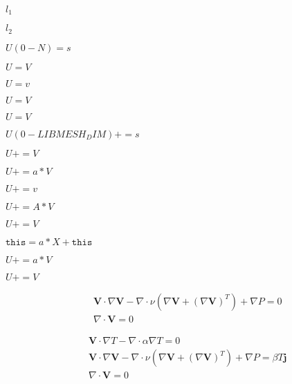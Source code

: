 \documentclass{article}
\begin{document}
$l_1$
\pagebreak

$l_2$
\pagebreak

$U(0-N) = s$
\pagebreak

$U = V$
\pagebreak

$ U=v $
\pagebreak

$U=V$
\pagebreak

$ U=V $
\pagebreak

$U(0-LIBMESH_DIM)+=s$
\pagebreak

$U+=V$
\pagebreak

$U+=a*V$
\pagebreak

$ U+=v $
\pagebreak

$U+=A*V$
\pagebreak

$ U+=V $
\pagebreak

$\texttt{this} = a*X + \texttt{this} $
\pagebreak

$ U+=a*V $
\pagebreak

$U+=V $
\pagebreak

\begin{eqnarray*} && \mathbf{V} \cdot \nabla \mathbf{V} - \nabla \cdot \nu (\nabla \mathbf{V} +(\nabla \mathbf{V})^T) +\nabla P = 0 \\ && \nabla \cdot \mathbf{V} = 0 \end{eqnarray*}
\pagebreak

\begin{eqnarray*} && \mathbf{V} \cdot \nabla T - \nabla \cdot\alpha \nabla T = 0 \\ && \mathbf{V} \cdot \nabla \mathbf{V} - \nabla \cdot \nu (\nabla \mathbf{V} +(\nabla \mathbf{V})^T) +\nabla P = \beta T \mathbf{j} \\ && \nabla \cdot \mathbf{V} = 0 \end{eqnarray*}
\pagebreak
\end{document}
